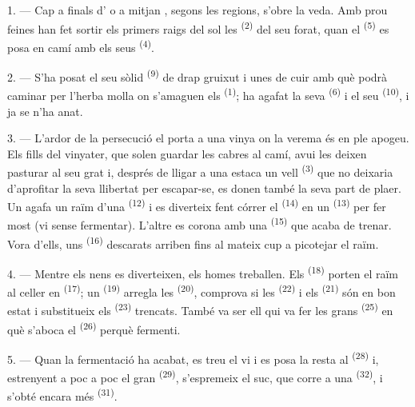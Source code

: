 \VUsaut{6.0mm}
\VUsaut{3.6mm}

\VUsaut{1.4mm}
\VUsaut{4.0mm}

1. --- Cap a finals d' o a mitjan , segons les
regions, s'obre la veda. Amb prou feines han fet sortir els primers raigs del sol
les  \textsuperscript{(2)} del seu forat, quan el
 \textsuperscript{(5)} es posa en camí amb els seus
 \textsuperscript{(4)}.

2. --- S'ha posat el seu sòlid  \textsuperscript{(9)} de
drap gruixut i unes  de cuir amb què podrà caminar per l'herba
molla on s'amaguen els  \textsuperscript{(1)}; ha agafat la seva
 \textsuperscript{(6)} i el seu 
\textsuperscript{(10)}, i ja se n'ha anat.

3. --- L'ardor de la persecució el porta a una vinya on la verema és en ple
apogeu. Els fills del vinyater, que solen guardar les cabres al camí, avui les
deixen pasturar al seu grat i, després de lligar a una estaca un vell
 \textsuperscript{(3)} que no deixaria d'aprofitar la seva llibertat
per escapar-se, es donen també la seva part de plaer. Un agafa un raïm d'una
 \textsuperscript{(12)} i es diverteix fent córrer el
 \textsuperscript{(14)} en un  \textsuperscript{(13)} per
fer most (vi sense fermentar). L'altre es corona amb una  \textsuperscript{(15)} que acaba de trenar. Vora d'ells, uns
 \textsuperscript{(16)} descarats arriben fins al mateix cup a
picotejar el raïm.

4. --- Mentre els nens es diverteixen, els homes treballen. Els
 \textsuperscript{(18)} porten el raïm al celler en
 \textsuperscript{(17)}; un 
\textsuperscript{(19)} arregla les  \textsuperscript{(20)}, comprova
si les  \textsuperscript{(22)} i els 
\textsuperscript{(21)} són en bon estat i substitueix els 
\textsuperscript{(23)} trencats. També va ser ell qui va fer les grans
 \textsuperscript{(25)} en què s'aboca el 
\textsuperscript{(26)} perquè fermenti.

5. --- Quan la fermentació ha acabat, es treu el vi i es posa la resta al
 \textsuperscript{(28)} i, estrenyent a poc a poc el gran
 \textsuperscript{(29)}, s'espremeix el suc, que corre a una
 \textsuperscript{(32)}, i s'obté encara més 
\textsuperscript{(31)}.

